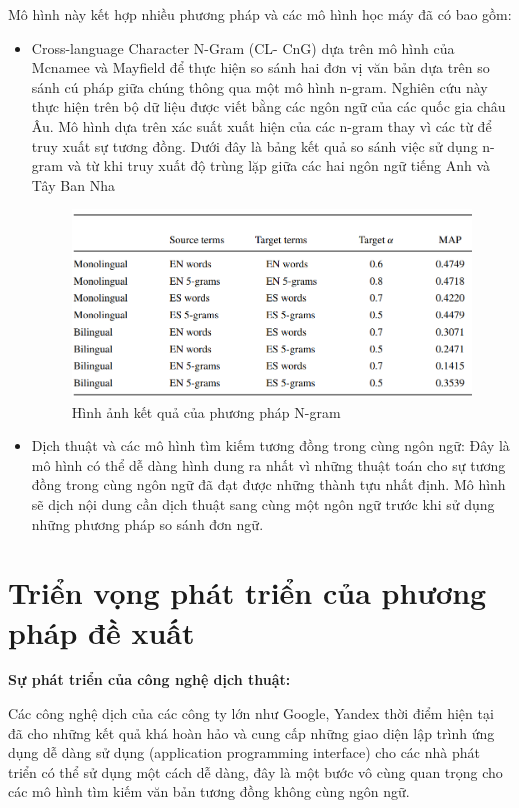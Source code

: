 \documentclass[12pt]{report}
\begin{document}
Mô hình này kết hợp nhiều phương pháp và các mô hình học máy đã có bao gồm:
\begin{itemize}
	\item Cross-language Character N-Gram (CL- CnG) dựa trên mô hình của Mcnamee và Mayfield \cite{cia-ngram} để thực hiện so sánh hai đơn vị văn bản dựa trên so sánh cú pháp giữa chúng thông qua một mô hình n-gram. Nghiên cứu này thực hiện trên bộ dữ liệu được viết bằng các ngôn ngữ của các quốc gia châu Âu. Mô hình dựa trên xác suất xuất hiện của các n-gram thay vì các từ để truy xuất sự tương đồng. Dưới đây là bảng kết quả so sánh việc sử dụng n-gram và từ khi truy xuất độ trùng lặp giữa các hai ngôn ngữ tiếng Anh và Tây Ban Nha
	\begin{figure}[h]
		\centering
		\includegraphics[scale=0.45]{ngram}
		\caption{Hình ảnh kết quả của phương pháp N-gram\cite{cia-ngram}}
	\end{figure}
	\item Dịch thuật và các mô hình tìm kiếm tương đồng trong cùng ngôn ngữ: Đây là mô hình có thể dễ dàng hình dung ra nhất vì những thuật toán cho sự tương đồng trong cùng ngôn ngữ đã đạt được những thành tựu nhất định. Mô hình sẽ dịch nội dung cần dịch thuật sang cùng một ngôn ngữ trước khi sử dụng những phương pháp so sánh đơn ngữ.
\end{itemize}

\section{Triển vọng phát triển của phương pháp đề xuất}

\textbf{Sự phát triển của công nghệ dịch thuật:}

Các công nghệ dịch của các công ty lớn như Google, Yandex thời điểm hiện tại đã cho những kết quả khá hoàn hảo và cung cấp những giao diện lập trình ứng dụng dễ dàng sử dụng (application programming interface) cho các nhà phát triển có thể sử dụng một cách dễ dàng, đây là một bước vô cùng quan trọng cho các mô hình tìm kiếm văn bản tương đồng không cùng ngôn ngữ. 
\end{document}
